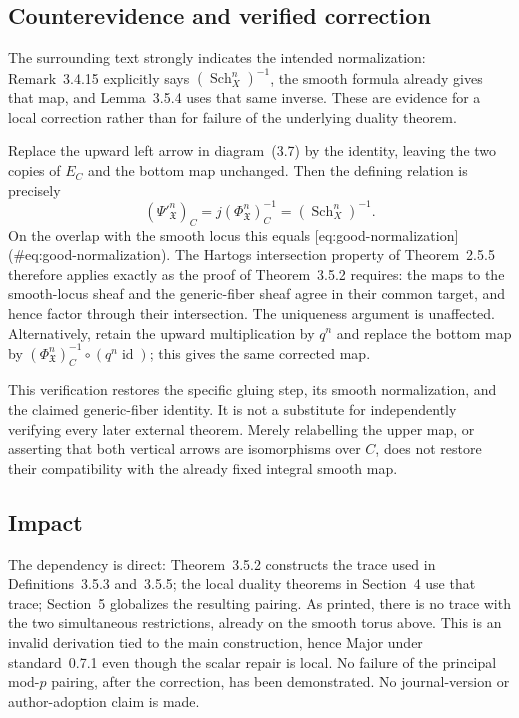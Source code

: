 \documentclass[10pt]{article}
\begin{document}
\subsection*{Counterevidence and verified correction}
The surrounding text strongly indicates the intended normalization: Remark 3.4.15 explicitly says \((\operatorname{Sch}_X^n)^{-1}\), the smooth formula already gives that map, and Lemma 3.5.4 uses that same inverse. These are evidence for a local correction rather than for failure of the underlying duality theorem.\par
Replace the upward left arrow in diagram (3.7) by the identity, leaving the two copies of \(E_C\) and the bottom map unchanged. Then the defining relation is precisely \[(\Psi'^n_{\mathfrak X})_C=j(\Phi^n_{\mathfrak X})_C^{-1}
              =(\operatorname{Sch}_X^n)^{-1}.\] On the overlap with the smooth locus this equals [eq:good-normalization] (\#eq:good-normalization). The Hartogs intersection property of Theorem 2.5.5 therefore applies exactly as the proof of Theorem 3.5.2 requires: the maps to the smooth-locus sheaf and the generic-fiber sheaf agree in their common target, and hence factor through their intersection. The uniqueness argument is unaffected. Alternatively, retain the upward multiplication by \(q^n\) and replace the bottom map by \((\Phi^n_{\mathfrak X})_C^{-1}\circ(q^n\operatorname{id})\); this gives the same corrected map.\par
This verification restores the specific gluing step, its smooth normalization, and the claimed generic-fiber identity. It is not a substitute for independently verifying every later external theorem. Merely relabelling the upper map, or asserting that both vertical arrows are isomorphisms over \(C\), does not restore their compatibility with the already fixed integral smooth map.\par
\subsection*{Impact}
The dependency is direct: Theorem 3.5.2 constructs the trace used in Definitions 3.5.3 and 3.5.5; the local duality theorems in Section 4 use that trace; Section 5 globalizes the resulting pairing. As printed, there is no trace with the two simultaneous restrictions, already on the smooth torus above. This is an invalid derivation tied to the main construction, hence Major under standard 0.7.1 even though the scalar repair is local. No failure of the principal mod-\(p\) pairing, after the correction, has been demonstrated. No journal-version or author-adoption claim is made.\par
\end{document}
